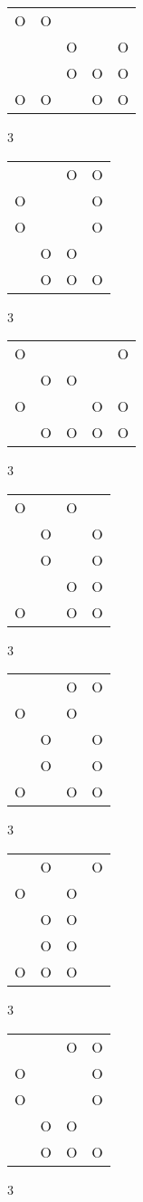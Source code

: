 \begin{tabular}{|m{0.2cm}m{0.2cm}m{0.2cm}m{0.2cm}m{0.2cm}|}\hline
O&O& & & \\
 & &O& &O\\
 & &O&O&O\\
O&O& &O&O\\
\hline\end{tabular}3
\begin{tabular}{|m{0.2cm}m{0.2cm}m{0.2cm}m{0.2cm}|}\hline
 & &O&O\\
O& & &O\\
O& & &O\\
 &O&O& \\
 &O&O&O\\
\hline\end{tabular}3
\begin{tabular}{|m{0.2cm}m{0.2cm}m{0.2cm}m{0.2cm}m{0.2cm}|}\hline
O& & & &O\\
 &O&O& & \\
O& & &O&O\\
 &O&O&O&O\\
\hline\end{tabular}3
\begin{tabular}{|m{0.2cm}m{0.2cm}m{0.2cm}m{0.2cm}|}\hline
O& &O& \\
 &O& &O\\
 &O& &O\\
 & &O&O\\
O& &O&O\\
\hline\end{tabular}3
\begin{tabular}{|m{0.2cm}m{0.2cm}m{0.2cm}m{0.2cm}|}\hline
 & &O&O\\
O& &O& \\
 &O& &O\\
 &O& &O\\
O& &O&O\\
\hline\end{tabular}3
\begin{tabular}{|m{0.2cm}m{0.2cm}m{0.2cm}m{0.2cm}|}\hline
 &O& &O\\
O& &O& \\
 &O&O& \\
 &O&O& \\
O&O&O& \\
\hline\end{tabular}3
\begin{tabular}{|m{0.2cm}m{0.2cm}m{0.2cm}m{0.2cm}|}\hline
 & &O&O\\
O& & &O\\
O& & &O\\
 &O&O& \\
 &O&O&O\\
\hline\end{tabular}3
